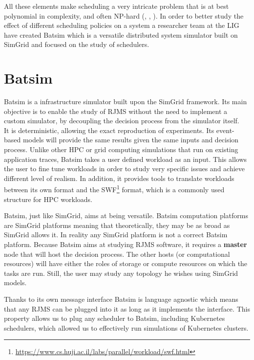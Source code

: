All these elements make scheduling a very intricate problem that is at best
polynomial in complexity, and often NP-hard
(\cite{10.1016/S0022-0000(75)80008-0}, \cite{scheduler-complexity}, \cite{BLAZEWICZ198311}). In order
to better study the effect of different scheduling policies on a system a
researcher team at the LIG have created Batsim which is a versatile
distributed system simulator built on SimGrid and focused on the study of
schedulers.


\section{Batsim}

Batsim \cite{dutot:hal-01333471} is a infrastructure simulator built upon
the SimGrid framework. Its main objective is to enable the study of RJMS
without the need to implement a custom simulator, by decoupling the decision
process from the simulator itself.\\

It is deterministic, allowing the exact reproduction of experiments.  Its
event-based models will provide the same results given the same inputs and
decision process.  Unlike other HPC or grid computing simulations that run on
existing application traces, Batsim takes a user defined workload as an input.
This allows the user to fine tune workloads in order to study very specific
issues and achieve different level of realism. In addition, it provides tools
to translate workloads between its own format and the
SWF\footnote{\url{https://www.cs.huji.ac.il/labs/parallel/workload/swf.html}} format,
which is a commonly used structure for HPC workloads.

Batsim, just like SimGrid, aims at being versatile.  Batsim computation
platforms are SimGrid platforms meaning that theoretically, they may be as
broad as SimGrid allows it. In reality any SimGrid platform is not a correct
Batsim platform.  Because Batsim aims at studying RJMS software, it requires a
\textbf{master} node that will host the decision process. The other hosts (or
computational resources) will have either the roles of storage or compute
resources on which the tasks are run. Still, the user may study any topology he
wishes using SimGrid models.

Thanks to its own message interface Batsim is language agnostic which means
that any RJMS can be plugged into it as long as it implements the interface.
This property allows us to plug any scheduler to Batsim, including
Kubernetes schedulers, which allowed us to effectively run simulations of
Kubernetes clusters.

